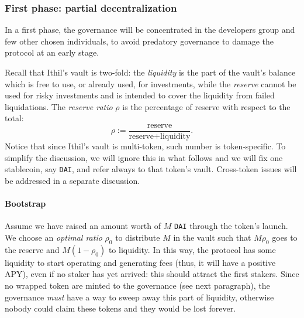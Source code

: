 \documentclass[a4paper,10 pt]{article}
\theoremstyle{definition}
\begin{document}
\subsubsection{First phase: partial decentralization}
In a first phase, the governance will be concentrated in the developers group and few other chosen individuals, to avoid predatory governance to damage the protocol at an early stage.

Recall that Ithil's vault is two-fold: the {\it liquidity} is the part of the vault's balance which is free to use, or already used, for investments, while the {\it reserve} cannot be used for risky investments and is intended to cover the liquidity from failed liquidations. The {\it reserve ratio} $\rho$ is the percentage of reserve with respect to the total:
$$\rho := \frac{\text{reserve}}{\text{reserve} + \text{liquidity}}.$$
Notice that since Ithil's vault is multi-token, such number is token-specific. To simplify the discussion, we will ignore this in what follows and we will fix one stablecoin, say \verb|DAI|, and refer always to that token's vault. Cross-token issues will be addressed in a separate discussion.

\paragraph{Bootstrap}\label{bootstrap}

Assume we have raised an amount worth of $M$ \verb|DAI| through the token's launch. We choose an {\it optimal ratio} $\rho_0$ to distribute $M$ in the vault such that $M\rho_0$ goes to the reserve and $M(1-\rho_0)$ to liquidity. In this way, the protocol has some liquidity to start operating and generating fees (thus, it will have a positive APY), even if no staker has yet arrived: this should attract the first stakers. Since no wrapped token are minted to the governance (see next paragraph), the governance {\it must} have a way to sweep away this part of liquidity, otherwise nobody could claim these tokens and they would be lost forever.
\end{document}

